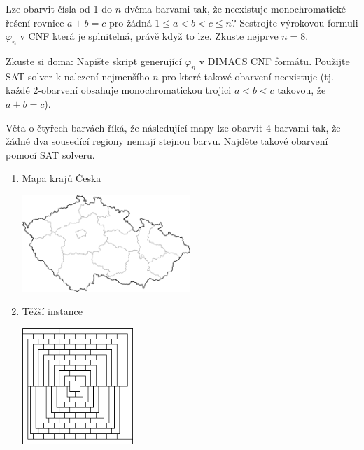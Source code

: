 \begin{problem}
    Lze obarvit čísla od 1 do $n$ dvěma barvami tak, že neexistuje monochromatické řešení rovnice
    $a+b=c$ pro žádná $1\leq a<b<c\leq n$? Sestrojte výrokovou formuli $\varphi_n$ v CNF která je splnitelná, právě když to lze. Zkuste nejprve $n=8$.
    
    Zkuste si doma: Napište skript generující $\varphi_n$ v DIMACS CNF formátu. Použijte SAT solver k nalezení nejmenšího $n$ pro které takové obarvení neexistuje (tj. každé 2-obarvení obsahuje monochromatickou trojici $a<b<c$ takovou, že $a+b=c$).
\end{problem}

    
\begin{problem}

    Věta o čtyřech barvách říká, že následující mapy lze obarvit 4 barvami tak, že žádné dva sousedící regiony nemají stejnou barvu. Najděte takové obarvení pomocí SAT solveru.
    \begin{multicols}{2}
    \begin{enumerate}
        \item Mapa krajů Česka  
        
        \vfill \includegraphics[width=0.5\textwidth]{files/map-coloring-czechia.png} \vfill
        
        \item Těžší instance  
        
        \vfill \includegraphics[width=0.33\textwidth]{files/map-coloring-hard.png} \vfill
    \end{enumerate}
    \end{multicols}

\end{problem}



